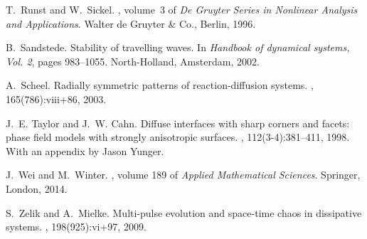 \documentclass[10pt]{article}
\begin{document}
\begin{thebibliography}{10}
T.~Runst and W.~Sickel.
, volume~3 of {\em De Gruyter Series
  in Nonlinear Analysis and Applications}.
\newblock Walter de Gruyter \& Co., Berlin, 1996.

B.~Sandstede.
\newblock Stability of travelling waves.
\newblock In {\em Handbook of dynamical systems, {V}ol. 2}, pages 983--1055.
  North-Holland, Amsterdam, 2002.

A.~Scheel.
\newblock Radially symmetric patterns of reaction-diffusion systems.
, 165(786):viii+86, 2003.

J.~E. Taylor and J.~W. Cahn.
\newblock Diffuse interfaces with sharp corners and facets: phase field models
  with strongly anisotropic surfaces.
, 112(3-4):381--411, 1998.
\newblock With an appendix by Jason Yunger.

J.~Wei and M.~Winter.
, volume 189 of {\em Applied Mathematical Sciences}.
\newblock Springer, London, 2014.

S.~Zelik and A.~Mielke.
\newblock Multi-pulse evolution and space-time chaos in dissipative systems.
, 198(925):vi+97, 2009.

\end{thebibliography}
\end{document}
